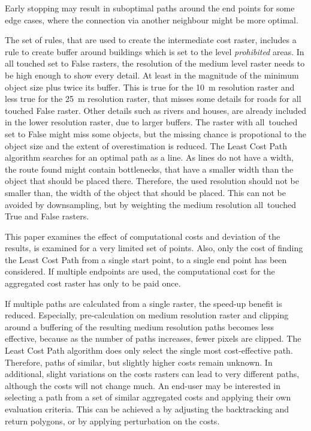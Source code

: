 Early stopping may result in suboptimal paths around the end points for some edge cases, where the connection via another neighbour might be more optimal.

The set of rules, that are used to create the intermediate cost raster, includes a rule to create buffer around buildings which is set to the level \textit{prohibited} areas.
In all touched set to False rasters, the resolution of the medium level raster needs to be high enough to show every detail.
At least in the magnitude of the minimum object size plus twice its buffer.
This is true for the 10~m resolution raster and less true for the 25~m resolution raster, that misses some details for roads for all touched False raster.
Other details such as rivers and houses, are already included in the lower resolution raster, due to larger buffers.
The raster with all~touched set to False might miss some objects, but the missing chance is propotional to the object size and the extent of overestimation is reduced.
The Least Cost Path algorithm searches for an optimal path as a line.
As lines do not have a width, the route found might contain bottlenecks, that have a smaller width than the object that should be placed there.
Therefore, the used resolution should not be smaller than, the width of the object that should be placed.
This can not be avoided by downsampling, but by weighting the medium resolution all~touched True and False rasters.


This paper examines the effect of computational costs and deviation of the results, is examined for a very limited set of points.
Also, only the cost of finding the Least Cost Path from a single start point, to a single end point has been considered.
If multiple endpoints are used, the computational cost for the aggregated cost raster has only to be paid once.

If multiple paths are calculated from a single raster, the speed-up benefit is reduced.
Especially, pre-calculation on medium resolution raster and clipping around a buffering of the resulting medium resolution paths becomes less effective, because as the number of paths increases, fewer pixels are clipped.
The Least Cost Path algorithm does only select the single most cost-effective path.
Therefore, paths of similar, but slightly higher costs remain unknown.
In additional, slight variations on the costs rasters can lead to very different paths, although the costs will not change much.
An end-user may be interested in selecting a path from a set of similar aggregated costs and applying their own evaluation criteria.
This can be achieved a by adjusting the backtracking and return polygons, or by applying perturbation on the costs.


